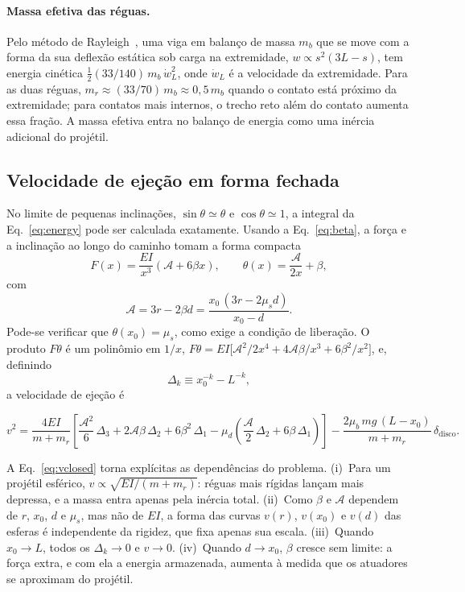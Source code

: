 \documentclass[aps,pre,twocolumn,superscriptaddress,nofootinbib,floatfix]{revtex4-2}
\begin{document}
\paragraph*{Massa efetiva das réguas.} Pelo método de Rayleigh~\cite{rayleigh1877}, uma viga em balanço de massa $m_b$ que se move com a forma da sua deflexão estática sob carga na extremidade, $w\propto s^2(3L-s)$, tem energia cinética $\tfrac12(33/140)\,m_b\,\dot w_L^2$, onde $\dot w_L$ é a velocidade da extremidade. Para as duas réguas, $m_r\approx(33/70)\,m_b\approx0{,}5\,m_b$ quando o contato está próximo da extremidade; para contatos mais internos, o trecho reto além do contato aumenta essa fração. A massa efetiva entra no balanço de energia como uma inércia adicional do projétil.

\subsection{Velocidade de ejeção em forma fechada}

No limite de pequenas inclinações, $\sin\theta\simeq\theta$ e $\cos\theta\simeq1$, a integral da Eq.~\eqref{eq:energy} pode ser calculada exatamente. Usando a Eq.~\eqref{eq:beta}, a força e a inclinação ao longo do caminho tomam a forma compacta
\begin{equation}
  F(x) = \frac{EI}{x^3}\left(\mathcal A + 6\beta x\right),
  \qquad
  \theta(x) = \frac{\mathcal A}{2x} + \beta,
  \label{eq:Ftheta_compact}
\end{equation}
com
\begin{equation}
  \mathcal A = 3r-2\beta d = \frac{x_0\,(3r-2\mu_sd)}{x_0-d} .
\end{equation}
Pode-se verificar que $\theta(x_0)=\mu_s$, como exige a condição de liberação. O produto $F\theta$ é um polinômio em $1/x$, $F\theta=EI\big[\mathcal A^2/2x^4 + 4\mathcal A\beta/x^3 + 6\beta^2/x^2\big]$, e, definindo
\begin{equation}
  \Delta_k \equiv x_0^{-k} - L^{-k},
\end{equation}
a velocidade de ejeção é
\begin{widetext}
\begin{equation}
  v^2 = \frac{4EI}{m+m_r}\left[\frac{\mathcal A^2}{6}\,\Delta_3 + 2\mathcal A\beta\,\Delta_2 + 6\beta^2\,\Delta_1
  - \mu_d\left(\frac{\mathcal A}{2}\,\Delta_2 + 6\beta\,\Delta_1\right)\right]
  - \frac{2\mu_b\,mg\,(L-x_0)}{m+m_r}\,\delta_{\mathrm{disco}} .
  \label{eq:vclosed}
\end{equation}
\end{widetext}
A Eq.~\eqref{eq:vclosed} torna explícitas as dependências do problema. (i)~Para um projétil esférico, $v\propto\sqrt{EI/(m+m_r)}$: réguas mais rígidas lançam mais depressa, e a massa entra apenas pela inércia total. (ii)~Como $\beta$ e $\mathcal A$ dependem de $r$, $x_0$, $d$ e $\mu_s$, mas não de $EI$, a forma das curvas $v(r)$, $v(x_0)$ e $v(d)$ das esferas é independente da rigidez, que fixa apenas sua escala. (iii)~Quando $x_0\to L$, todos os $\Delta_k\to0$ e $v\to0$. (iv)~Quando $d\to x_0$, $\beta$ cresce sem limite: a força extra, e com ela a energia armazenada, aumenta à medida que os atuadores se aproximam do projétil.
\end{document}
